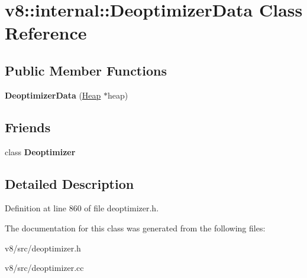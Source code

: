 \hypertarget{classv8_1_1internal_1_1DeoptimizerData}{}\section{v8\+:\+:internal\+:\+:Deoptimizer\+Data Class Reference}
\label{classv8_1_1internal_1_1DeoptimizerData}
\subsection*{Public Member Functions}
\begin{DoxyCompactItemize}
\item 
\mbox{\label{classv8_1_1internal_1_1DeoptimizerData_aeb6a2e11786945e51cee0b615f480241}} 
{\bfseries Deoptimizer\+Data} (\mbox{\hyperlink{classv8_1_1internal_1_1Heap}{Heap}} $\ast$heap)
\end{DoxyCompactItemize}
\subsection*{Friends}
\begin{DoxyCompactItemize}
\item 
\mbox{\label{classv8_1_1internal_1_1DeoptimizerData_aa89911581cd6ded032f998021aef9e5c}} 
class {\bfseries Deoptimizer}
\end{DoxyCompactItemize}


\subsection{Detailed Description}


Definition at line 860 of file deoptimizer.\+h.



The documentation for this class was generated from the following files\+:\begin{DoxyCompactItemize}
\item 
v8/src/deoptimizer.\+h\item 
v8/src/deoptimizer.\+cc\end{DoxyCompactItemize}
